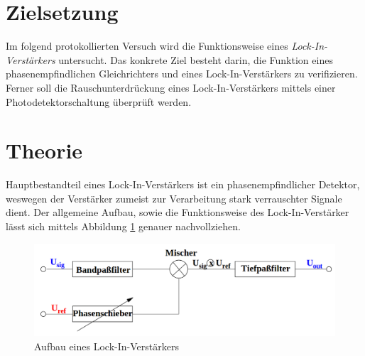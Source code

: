 


\section{Zielsetzung}
\label{sec:Zielsetzung}

Im folgend protokollierten Versuch wird die Funktionsweise eines \emph{Lock-In-Verstärkers} untersucht.
Das konkrete Ziel besteht darin, die Funktion eines phasenempfindlichen Gleichrichters und eines Lock-In-Verstärkers
zu verifizieren. Ferner soll die Rauschunterdrückung eines Lock-In-Verstärkers mittels einer Photodetektorschaltung
überprüft werden.

\section{Theorie}
\label{sec:Theorie}

Hauptbestandteil eines Lock-In-Verstärkers ist ein phasenempfindlicher Detektor, weswegen der Verstärker zumeist zur 
Verarbeitung stark verrauschter Signale dient. Der allgemeine Aufbau, sowie die Funktionsweise des Lock-In-Verstärker lässt
sich mittels Abbildung \ref{fig:Versuchsaufbau} genauer nachvollziehen.

\begin{figure}[H]
    \centering
    \includegraphics[width=\textwidth]{Versuchsaufbau.png}
    \caption{Aufbau eines Lock-In-Verstärkers}
    \label{fig:Versuchsaufbau}
\end{figure}

